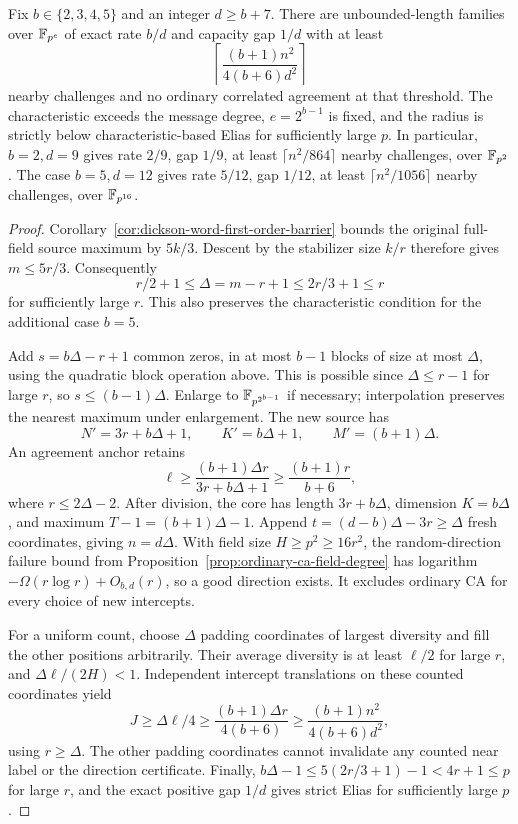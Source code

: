 \begin{corollary}\label{cor:ordinary-ca-parameter-family}
Fix $b\in\{2,3,4,5\}$ and an integer $d\ge b+7$. There are unbounded-length
families over $\mathbb F_{p^e}$ of exact rate $b/d$ and capacity gap $1/d$
with at least
\[
 \left\lceil\frac{(b+1)n^2}{4(b+6)d^2}\right\rceil
\]
nearby challenges and no ordinary correlated agreement at that threshold.
The characteristic exceeds the message degree, $e=2^{b-1}$ is fixed, and the
radius is strictly below characteristic-based Elias for sufficiently
large $p$. In particular, $b=2,d=9$ gives rate $2/9$, gap $1/9$,
at least $\lceil n^2/864\rceil$ nearby challenges, over $\mathbb F_{p^2}$.
The case $b=5,d=12$ gives rate $5/12$, gap $1/12$, at least
$\lceil n^2/1056\rceil$ nearby challenges, over $\mathbb F_{p^{16}}$.
\end{corollary}
\begin{proof}
Corollary~\ref{cor:dickson-word-first-order-barrier} bounds the original
full-field source maximum by $5k/3$. Descent by the stabilizer size
$k/r$ therefore gives $m\le5r/3$. Consequently
\[
 r/2+1\le\Delta=m-r+1\le2r/3+1\le r
\]
for sufficiently large $r$. This also preserves the characteristic
condition for the additional case $b=5$.

Add $s=b\Delta-r+1$ common zeros, in at most $b-1$ blocks of
size at most $\Delta$, using the quadratic block operation above.
This is possible since $\Delta\le r-1$ for large $r$, so
$s\le(b-1)\Delta$. Enlarge to $\mathbb F_{p^{2^{b-1}}}$ if necessary;
interpolation preserves the nearest maximum under enlargement.
The new source has
\[
 N'=3r+b\Delta+1,\qquad K'=b\Delta+1,\qquad M'=(b+1)\Delta.
\]
An agreement anchor retains
\[
 \ell\ge\frac{(b+1)\Delta r}{3r+b\Delta+1}
       \ge\frac{(b+1)r}{b+6},
\]
where $r\le2\Delta-2$. After division, the core has length
$3r+b\Delta$, dimension $K=b\Delta$, and maximum $T-1=(b+1)\Delta-1$.
Append $t=(d-b)\Delta-3r\ge\Delta$ fresh coordinates, giving
$n=d\Delta$. With field size $H\ge p^2\ge16r^2$, the random-direction
failure bound from Proposition~\ref{prop:ordinary-ca-field-degree}
has logarithm $-\Omega(r\log r)+O_{b,d}(r)$, so a good direction exists.
It excludes ordinary CA for every choice of new intercepts.

For a uniform count, choose $\Delta$ padding coordinates of largest
diversity and fill the other positions arbitrarily. Their average
diversity is at least $\ell/2$ for large $r$, and
$\Delta\ell/(2H)<1$. Independent intercept translations on these
counted coordinates yield
\[
 J\ge\Delta\ell/4\ge\frac{(b+1)\Delta r}{4(b+6)}
   \ge\frac{(b+1)n^2}{4(b+6)d^2},
\]
using $r\ge\Delta$. The other padding coordinates cannot invalidate
any counted near label or the direction certificate. Finally,
$b\Delta-1\le5(2r/3+1)-1<4r+1\le p$ for large $r$, and the exact
positive gap $1/d$ gives strict Elias for sufficiently large $p$.
\end{proof}

